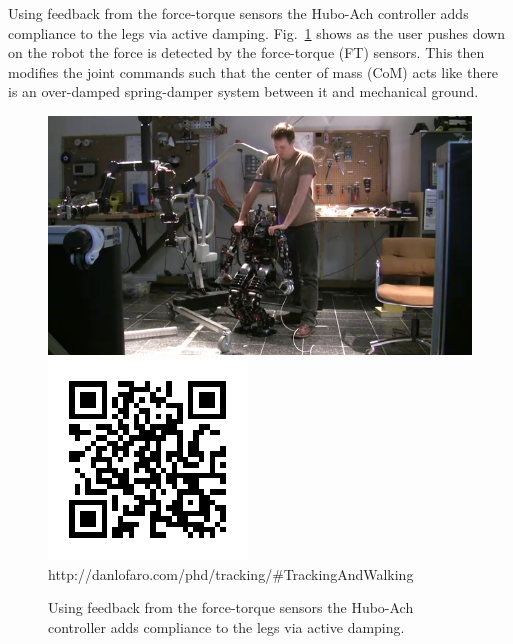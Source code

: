 Using feedback from the force-torque sensors the Hubo-Ach controller adds compliance to the legs via active damping.
Fig.~\ref{fig:activedamping} shows as the user pushes down on the robot the force is detected by the force-torque (FT) sensors.
This then modifies the joint commands such that the center of mass (CoM) acts like there is an over-damped spring-damper system between it and mechanical ground.

\begin{figure}[thpb]
  \centering
\includegraphics[width=0.6\columnwidth]{./pix/activedamping.png}
\includegraphics[width=0.3\columnwidth]{./qrcode/qrcode-activedamping.png}\\
     http://danlofaro.com/phd/tracking/\#TrackingAndWalking
  \caption{Using feedback from the force-torque sensors the Hubo-Ach controller adds compliance to the legs via active damping. }
  \label{fig:activedamping}
\end{figure}
